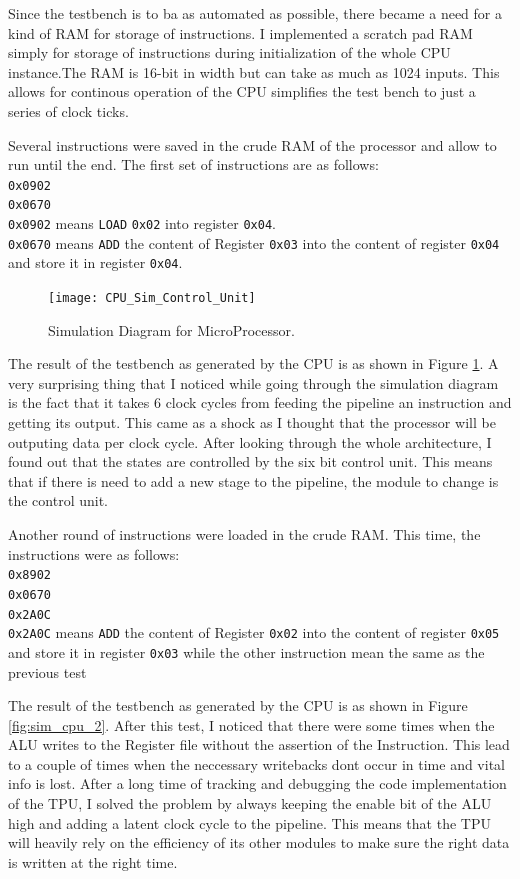 Since the testbench is to ba as automated as possible, there became a need for a kind of RAM for storage of instructions. I implemented a scratch pad RAM simply for storage of instructions during initialization of the whole CPU instance.The RAM is 16-bit in width but can take as much as 1024 inputs. This allows for continous operation of the CPU simplifies the test bench to just a series of clock ticks. 

Several instructions were saved in the crude RAM of the processor and allow to run until the end. 
The first set of instructions are as follows:\\
\verb|0x0902| \\
\verb|0x0670|	\\
\verb|0x0902| means \verb|LOAD| \verb|0x02| into register \verb|0x04|.\\
\verb|0x0670| means \verb|ADD| the content of Register \verb|0x03| into the content of register \verb|0x04| and store it in register \verb|0x04|.

\begin{figure}
    \centering
    \texttt{[image: CPU\_Sim\_Control\_Unit]}
	\caption{Simulation Diagram for MicroProcessor.}
    \label{fig:sim_cpu}
\end{figure}

The result of the testbench as generated by the CPU is as shown in Figure \ref{fig:sim_cpu}.
A very surprising thing that I noticed while going through the simulation diagram is the fact that it takes 6 clock cycles from feeding the pipeline an instruction and getting its output. This came as a shock as I thought that the processor will be outputing data per clock cycle. After looking through the whole architecture, I found out that the states are controlled by the six bit control unit. This means that if there is need to add a new stage to the pipeline, the module to change is the control unit.

Another round of instructions were loaded in the crude RAM. This time, the instructions were as follows:\\
\verb|0x8902| \\
\verb|0x0670|	\\
\verb|0x2A0C|	\\
\verb|0x2A0C| means \verb|ADD| the content of Register \verb|0x02| into the content of register \verb|0x05| and store it in register \verb|0x03| while the other instruction mean the same as the previous test


The result of the testbench as generated by the CPU is as shown in Figure \ref{fig:sim_cpu_2}. After this test, I noticed that there were some times when the ALU writes to the Register file without the assertion of the Instruction. This lead to a couple of times when the neccessary writebacks dont occur in time and vital info is lost. After a long time of tracking and debugging the code implementation of the TPU, I solved the problem by always keeping the enable bit of the ALU high and adding a latent clock cycle to the pipeline. This means that the TPU will heavily rely on the efficiency of its other modules to make sure the right data is written at the right time. 


